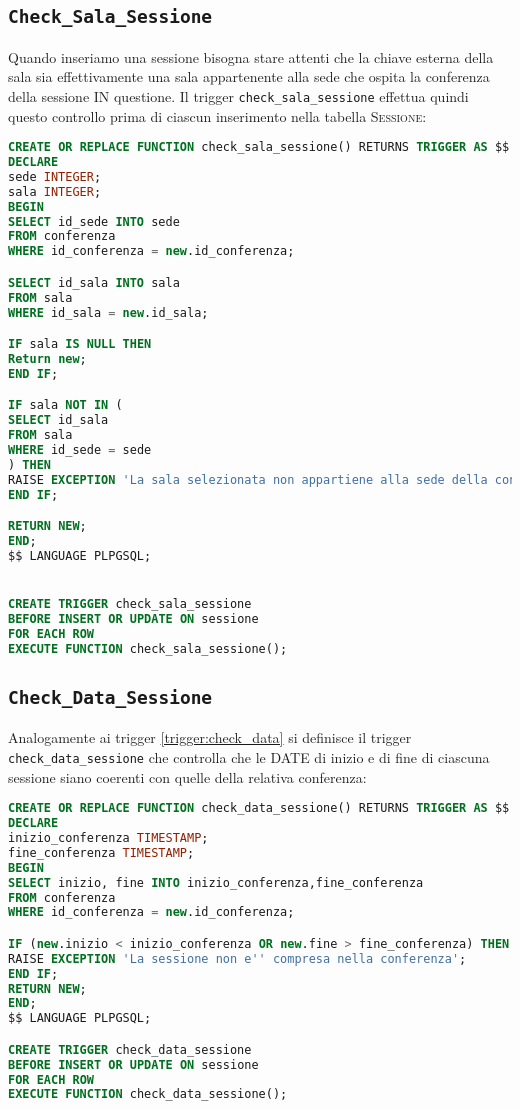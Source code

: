 \subsection{\texttt{Check\_Sala\_Sessione}}
Quando inseriamo una sessione bisogna stare attenti che la chiave esterna della sala sia effettivamente una sala appartenente alla sede che ospita la conferenza della sessione IN questione. Il trigger \texttt{check\_sala\_sessione} effettua quindi questo controllo prima di ciascun inserimento nella tabella \textsc{Sessione}:
\begin{lstlisting}[language=SQL, style=mystyle]
CREATE OR REPLACE FUNCTION check_sala_sessione() RETURNS TRIGGER AS $$
DECLARE
sede INTEGER;
sala INTEGER;
BEGIN
SELECT id_sede INTO sede
FROM conferenza
WHERE id_conferenza = new.id_conferenza;

SELECT id_sala INTO sala
FROM sala
WHERE id_sala = new.id_sala;

IF sala IS NULL THEN
Return new;
END IF;

IF sala NOT IN (
SELECT id_sala
FROM sala
WHERE id_sede = sede
) THEN
RAISE EXCEPTION 'La sala selezionata non appartiene alla sede della conferenza';
END IF;

RETURN NEW;
END;
$$ LANGUAGE PLPGSQL;


CREATE TRIGGER check_sala_sessione
BEFORE INSERT OR UPDATE ON sessione
FOR EACH ROW
EXECUTE FUNCTION check_sala_sessione();
\end{lstlisting}
\subsection{\texttt{Check\_Data\_Sessione}}
Analogamente ai trigger \ref{trigger:check_data} si definisce il trigger \texttt{check\_data\_sessione} che controlla che le DATE di inizio e di fine di ciascuna sessione siano coerenti con quelle della relativa conferenza:
\begin{lstlisting}[language=SQL, style=mystyle, caption={\texttt{check\_data\_sessione}}]
CREATE OR REPLACE FUNCTION check_data_sessione() RETURNS TRIGGER AS $$
DECLARE
inizio_conferenza TIMESTAMP;
fine_conferenza TIMESTAMP;
BEGIN
SELECT inizio, fine INTO inizio_conferenza,fine_conferenza
FROM conferenza
WHERE id_conferenza = new.id_conferenza;

IF (new.inizio < inizio_conferenza OR new.fine > fine_conferenza) THEN
RAISE EXCEPTION 'La sessione non e'' compresa nella conferenza';
END IF;
RETURN NEW;
END;
$$ LANGUAGE PLPGSQL;

CREATE TRIGGER check_data_sessione
BEFORE INSERT OR UPDATE ON sessione
FOR EACH ROW
EXECUTE FUNCTION check_data_sessione();
\end{lstlisting}
